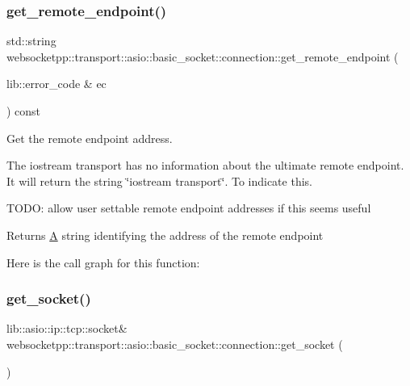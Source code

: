 \subsubsection{\texorpdfstring{get\+\_\+remote\+\_\+endpoint()}{get\_remote\_endpoint()}}
{\footnotesize\ttfamily std\+::string websocketpp\+::transport\+::asio\+::basic\+\_\+socket\+::connection\+::get\+\_\+remote\+\_\+endpoint (\begin{DoxyParamCaption}\item[{lib\+::error\+\_\+code \&}]{ec }\end{DoxyParamCaption}) const\hspace{0.3cm}{\ttfamily [inline]}}



Get the remote endpoint address. 

The iostream transport has no information about the ultimate remote endpoint. It will return the string \char`\"{}iostream transport\char`\"{}. To indicate this.

T\+O\+DO\+: allow user settable remote endpoint addresses if this seems useful

\begin{DoxyReturn}{Returns}
\mbox{\hyperlink{struct_a}{A}} string identifying the address of the remote endpoint 
\end{DoxyReturn}
Here is the call graph for this function\+:
\mbox{\label{classwebsocketpp_1_1transport_1_1asio_1_1basic__socket_1_1connection_ae5026a6893c7bc54be3f7981fceaf849}} 
\subsubsection{\texorpdfstring{get\+\_\+socket()}{get\_socket()}}
{\footnotesize\ttfamily lib\+::asio\+::ip\+::tcp\+::socket\& websocketpp\+::transport\+::asio\+::basic\+\_\+socket\+::connection\+::get\+\_\+socket (\begin{DoxyParamCaption}{ }\end{DoxyParamCaption})\hspace{0.3cm}{\ttfamily [inline]}}




